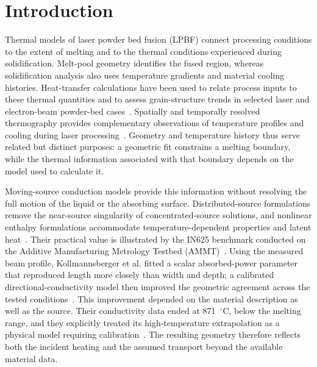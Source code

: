 \section{Introduction}
\label{sec:introduction}

Thermal models of laser powder bed fusion (LPBF) connect processing conditions to the extent of melting and to the thermal conditions experienced during solidification. Melt-pool geometry identifies the fused region, whereas solidification analysis also uses temperature gradients and material cooling histories. Heat-transfer calculations have been used to relate process inputs to these thermal quantities and to assess grain-structure trends in selected laser and electron-beam powder-bed cases~\cite{Plotkowski2017Rapid}. Spatially and temporally resolved thermography provides complementary observations of temperature profiles and cooling during laser processing~\cite{hooper2018}. Geometry and temperature history thus serve related but distinct purposes: a geometric fit constrains a melting boundary, while the thermal information associated with that boundary depends on the model used to calculate it.

Moving-source conduction models provide this information without resolving the full motion of the liquid or the absorbing surface. Distributed-source formulations remove the near-source singularity of concentrated-source solutions, and nonlinear enthalpy formulations accommodate temperature-dependent properties and latent heat~\cite{vanelsen2007}. Their practical value is illustrated by the IN625 benchmark conducted on the Additive Manufacturing Metrology Testbed (AMMT)~\cite{lane2020}. Using the measured beam profile, Kollmannsberger et al. fitted a scalar absorbed-power parameter that reproduced length more closely than width and depth; a calibrated directional-conductivity model then improved the geometric agreement across the tested conditions~\cite{kollmannsberger2019}. This improvement depended on the material description as well as the source. Their conductivity data ended at 871~$^\circ$C, below the melting range, and they explicitly treated its high-temperature extrapolation as a physical model requiring calibration~\cite{kollmannsberger2019}. The resulting geometry therefore reflects both the incident heating and the assumed transport beyond the available material data.

